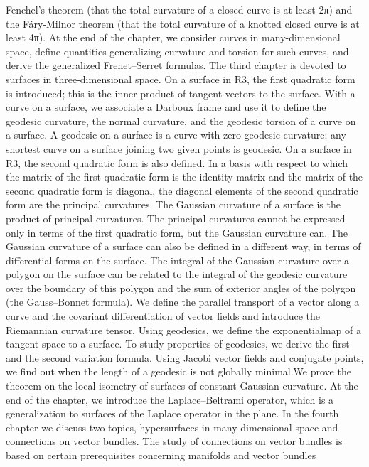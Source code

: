 \documentclass[a4paper,10pt]{article}
\begin{document}
Fenchel’s theorem (that the total curvature of a closed curve is at least 2π) and
the Fáry-Milnor theorem (that the total curvature of a knotted closed curve is at
least 4π). At the end of the chapter, we consider curves in many-dimensional space,
define quantities generalizing curvature and torsion for such curves, and derive the
generalized Frenet–Serret formulas.
The third chapter is devoted to surfaces in three-dimensional space. On a surface
in R3, the first quadratic form is introduced; this is the inner product of tangent
vectors to the surface. With a curve on a surface, we associate a Darboux frame
and use it to define the geodesic curvature, the normal curvature, and the geodesic
torsion of a curve on a surface. A geodesic on a surface is a curve with zero geodesic
curvature; any shortest curve on a surface joining two given points is geodesic.
On a surface in R3, the second quadratic form is also defined. In a basis with
respect to which the matrix of the first quadratic form is the identity matrix and
the matrix of the second quadratic form is diagonal, the diagonal elements of the
second quadratic form are the principal curvatures. The Gaussian curvature of a
surface is the product of principal curvatures. The principal curvatures cannot be
expressed only in terms of the first quadratic form, but the Gaussian curvature can.
The Gaussian curvature of a surface can also be defined in a different way, in terms
of differential forms on the surface. The integral of the Gaussian curvature over
a polygon on the surface can be related to the integral of the geodesic curvature
over the boundary of this polygon and the sum of exterior angles of the polygon
(the Gauss–Bonnet formula). We define the parallel transport of a vector along a
curve and the covariant differentiation of vector fields and introduce the Riemannian
curvature tensor. Using geodesics, we define the exponentialmap of a tangent space
to a surface. To study properties of geodesics, we derive the first and the second
variation formula. Using Jacobi vector fields and conjugate points, we find out when
the length of a geodesic is not globally minimal.We prove the theorem on the local
isometry of surfaces of constant Gaussian curvature. At the end of the chapter, we
introduce the Laplace–Beltrami operator, which is a generalization to surfaces of
the Laplace operator in the plane.
In the fourth chapter we discuss two topics, hypersurfaces in many-dimensional
space and connections on vector bundles. The study of connections on vector
bundles is based on certain prerequisites concerning manifolds and vector bundles
\end{document}
